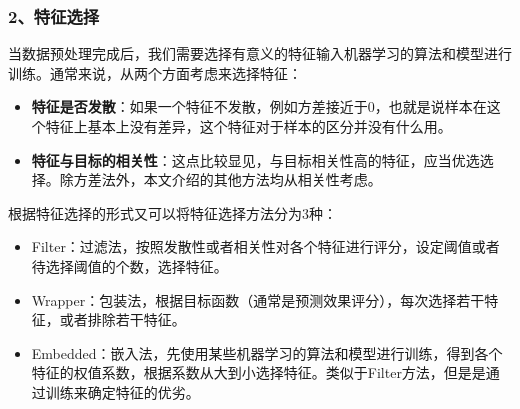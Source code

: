 \documentclass[
]{article}
\begin{document}
\subsubsection{2、特征选择}\label{2ux7279ux5f81ux9009ux62e9}

当数据预处理完成后，我们需要选择有意义的特征输入机器学习的算法和模型进行训练。通常来说，从两个方面考虑来选择特征：

\begin{itemize}
\item
  \textbf{特征是否发散}：如果一个特征不发散，例如方差接近于0，也就是说样本在这个特征上基本上没有差异，这个特征对于样本的区分并没有什么用。
\item
  \textbf{特征与目标的相关性}：这点比较显见，与目标相关性高的特征，应当优选选择。除方差法外，本文介绍的其他方法均从相关性考虑。
\end{itemize}

根据特征选择的形式又可以将特征选择方法分为3种：

\begin{itemize}
\item
  Filter：过滤法，按照发散性或者相关性对各个特征进行评分，设定阈值或者待选择阈值的个数，选择特征。
\item
  Wrapper：包装法，根据目标函数（通常是预测效果评分），每次选择若干特征，或者排除若干特征。
\item
  Embedded：嵌入法，先使用某些机器学习的算法和模型进行训练，得到各个特征的权值系数，根据系数从大到小选择特征。类似于Filter方法，但是是通过训练来确定特征的优劣。
\end{itemize}
\end{document}
